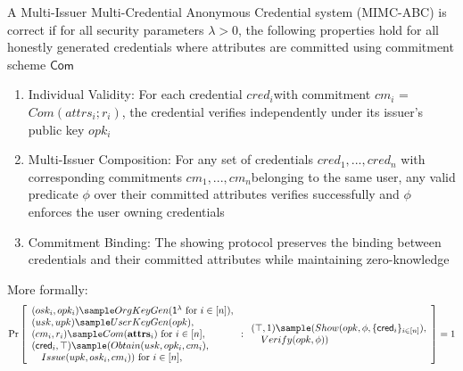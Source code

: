 \begin{definition}
A Multi-Issuer Multi-Credential Anonymous Credential system (MIMC-ABC) is correct if for all security parameters $\lambda > 0$, the following properties hold for all honestly generated credentials where attributes are committed using commitment scheme $\mathsf{Com}$

\begin{enumerate}
    \item Individual Validity: For each credential $cred_i $with commitment $cm_i$ = $Com(attrs_i; r_i)$, the credential verifies independently under its issuer's public key $opk_i$

    \item Multi-Issuer Composition: For any set of credentials ${cred_1,...,cred_n}$ with corresponding commitments ${cm_1,...,cm_n} $belonging to the same user, any valid predicate $\phi$ over their committed attributes verifies successfully and $\phi$ enforces the user owning credentials

    \item Commitment Binding: The showing protocol preserves the binding between credentials and their committed attributes while maintaining zero-knowledge
\end{enumerate}

\noindent More formally:
\[
        \Pr
            \left [
            \begin{array}{l}
                (osk_i, opk_i) \sample OrgKeyGen(\secparam \text{ for } i \in [n]),\\
                (usk, upk) \sample UserKeyGen(opk),\\
                (cm_i, r_i) \sample Com(\mathbf{attrs}_i) \text{ for } i \in [n],\\
                (\mathsf{cred}_i, \top) \sample (Obtain(usk, opk_i, cm_i),\\
                \quad Issue(upk, osk_i, cm_i)) \text{ for } i \in [n],\\
            \end{array}
                : 
                \begin{array}{l}
                    (\top, 1) \sample (Show(opk, \phi, \{\mathsf{cred}_i\}_{i \in [n]}),\\
                    \quad Verify(opk, \phi))
                \end{array}
                \right ]
             = 1
\]
\end{definition}


